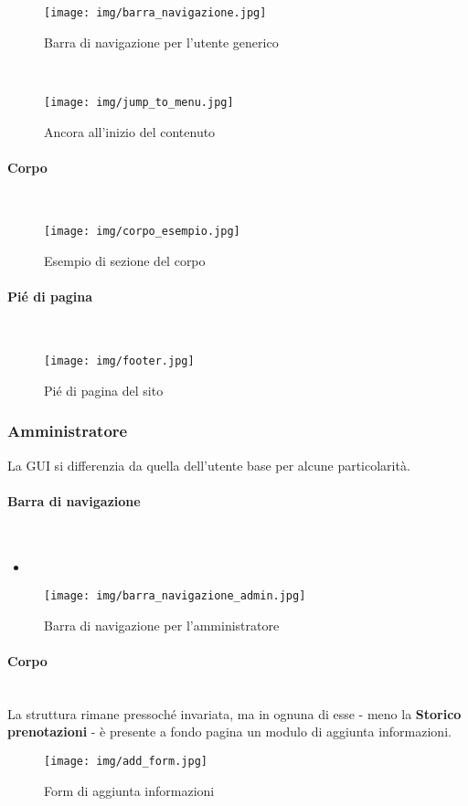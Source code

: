 \begin{figure}[h!]
	\centerline{\texttt{[image: img/barra\_navigazione.jpg]}}
	\caption{Barra di navigazione per l'utente generico}
	\label{fig:navbarGU}
\end{figure}
~\\

\begin{figure}[h!]
	\centerline{\texttt{[image: img/jump\_to\_menu.jpg]}}
	\caption{Ancora all'inizio del contenuto}
	\label{fig:anchor}
\end{figure}
\paragraph{Corpo}
~\\

\begin{figure}[h!]
	\centerline{\texttt{[image: img/corpo\_esempio.jpg]}}
	\caption{Esempio di sezione del corpo}
	\label{fig:corpoGU}
\end{figure}
\paragraph{Pié di pagina}
~\\

\begin{figure}[h!]
	\centerline{\texttt{[image: img/footer.jpg]}}
	\caption{Pié di pagina del sito}
	\label{fig:footer}
\end{figure}
\subsubsection{Amministratore}
La GUI si differenzia da quella dell'utente base per alcune particolarità.
\paragraph{Barra di navigazione}
~\\
\begin{itemize}
	\item \textbf{}
\end{itemize}

\begin{figure}[h!]
	\centerline{\texttt{[image: img/barra\_navigazione\_admin.jpg]}}
	\caption{Barra di navigazione per l'amministratore}
	\label{fig:navbarAD}
\end{figure}
\paragraph{Corpo}
~\\La struttura rimane pressoché invariata, ma in ognuna di esse - meno la \textbf{Storico prenotazioni} - è presente a fondo pagina un modulo di aggiunta informazioni.
\begin{figure}[h!]
	\centerline{\texttt{[image: img/add\_form.jpg]}}
	\caption{Form di aggiunta informazioni}
	\label{fig:addForm}
\end{figure}
